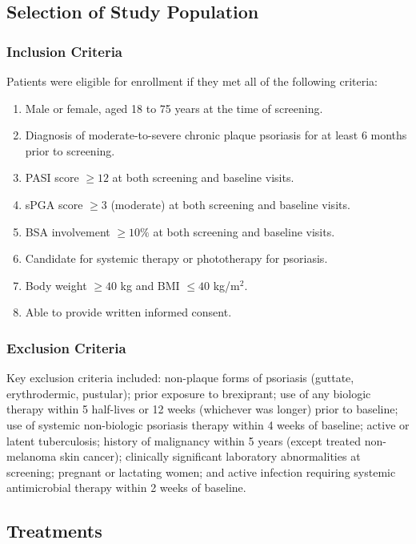 \subsection{Selection of Study Population}

\subsubsection{Inclusion Criteria}

Patients were eligible for enrollment if they met all of the following criteria:
\begin{enumerate}[label=\textbullet, leftmargin=*]
  \item Male or female, aged 18 to 75 years at the time of screening.
  \item Diagnosis of moderate-to-severe chronic plaque psoriasis for at least 6 months prior to screening.
  \item PASI score $\ge 12$ at both screening and baseline visits.
  \item sPGA score $\ge 3$ (moderate) at both screening and baseline visits.
  \item BSA involvement $\ge 10\%$ at both screening and baseline visits.
  \item Candidate for systemic therapy or phototherapy for psoriasis.
  \item Body weight $\ge 40$ kg and BMI $\le 40$ kg/m$^2$.
  \item Able to provide written informed consent.
\end{enumerate}

\subsubsection{Exclusion Criteria}

Key exclusion criteria included: non-plaque forms of psoriasis (guttate, erythrodermic, pustular); prior exposure to brexiprant; use of any biologic therapy within 5 half-lives or 12 weeks (whichever was longer) prior to baseline; use of systemic non-biologic psoriasis therapy within 4 weeks of baseline; active or latent tuberculosis; history of malignancy within 5 years (except treated non-melanoma skin cancer); clinically significant laboratory abnormalities at screening; pregnant or lactating women; and active infection requiring systemic antimicrobial therapy within 2 weeks of baseline.

\subsection{Treatments}

